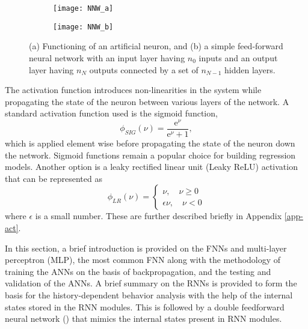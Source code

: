 \begin{figure}
	\centering
	\begin{subfigure}[t]{0.45\textwidth}
		\texttt{[image: NNW\_a]}
		\caption{}
	\end{subfigure}
	\begin{subfigure}[t]{0.45\textwidth}
		\texttt{[image: NNW\_b]}
		\caption{}
	\end{subfigure}
	\caption{(a) Functioning of an artificial neuron, and (b) a simple feed-forward neural network with an input layer having $ n_0 $ inputs and an output layer having $ n_N $ outputs connected by a set of $ n_{N-1} $ hidden layers\cite{wuRecurrentNeuralNetworkaccelerated2020}. }\label{fig-nn-nnw}
\end{figure}

The activation function introduces non-linearities in the system while propagating the state of the neuron between various layers of the network. A standard activation function used is the sigmoid function,
\begin{equation}\label{eq-nn-sigmoid}
\phi_{SIG}(\nu)=\frac{\text{e}^\nu}{\text{e}^\nu+1},
\end{equation}
which is applied element wise before propagating the state of the neuron down the network. Sigmoid functions remain a popular choice for building regression models\cite{leComputationalHomogenizationNonlinear2015}. Another option is a leaky rectified linear unit (Leaky ReLU) activation\cite{liuModifiedLeakyReLU2019} that can be represented as
\begin{equation}\label{eq-nn-lrelu}
\phi_{LR}(\nu)=
\begin{cases}
\nu,\quad \nu\ge0\\
\epsilon\nu,\quad \nu<0
\end{cases}
\end{equation}
where $ \epsilon $ is a small number. These are further described briefly in Appendix \ref{app-act}.

In this section, a brief introduction is provided on the FNNs and multi-layer perceptron (MLP), the most common FNN along with the methodology of training the ANNs on the basis of backpropagation, and the testing and validation of the ANNs. A brief summary on the RNNs is provided to form the basis for the history-dependent behavior analysis with the help of the internal states stored in the RNN modules. This is followed by a double feedforward neural network (\fnn)\cite{nguyenSurrogateModelsBasedUnderPreparation} that mimics the internal states present in RNN modules.

